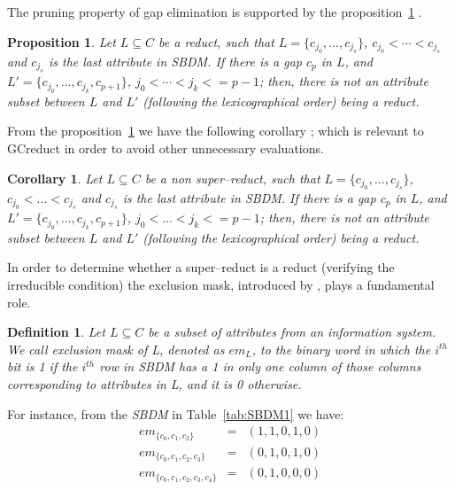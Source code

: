 \documentclass[authoryear,preprint,review,12pt]{elsarticle}
\newtheorem{proposition}{Proposition}
\newtheorem{definition}{Definition}
\newtheorem{corollary}{Corollary}
\begin{document}
	The pruning property of gap elimination is supported by the proposition~\ref{prop:gap} \citep{Santiesteban03}. 
%	
		
	\begin{proposition}\label{prop:gap} 
		Let $L \subseteq C$ be a reduct, such that $L = \lbrace c_{j_0},...,c_{j_s}\rbrace$, $c_{j_0}<\cdots
		<c_{j_s}$ and $c_{j_s}$ is the last attribute in SBDM. If there is a gap $c_p$ in $L$, and $L' = \lbrace
		c_{j_0},...,c_{j_k},c_{p+1}\rbrace$, $j_0<\cdots <j_k<=p-1$; then, there is not an attribute subset
		between $L$ and $L'$ (following the lexicographical order) being a reduct.
	\end{proposition}	
	
	From the proposition~\ref{prop:gap} we have the following corollary \citep{Santiesteban03}; which is relevant to GCreduct in order to avoid other unnecessary evaluations.
	
	\begin{corollary}\label{coro:gap} 
		Let $L \subseteq C$ be a non super--reduct, such that $L = \lbrace c_{j_0},...,c_{j_s}\rbrace$, 
		$c_{j_0}<...<c_{j_s}$ and $c_{j_s}$ is the last attribute in SBDM. If there is a gap $c_p$ in $L$, and 
		$L' = \lbrace c_{j_0},...,c_{j_k},c_{p+1}\rbrace$, $j_0<...<j_k<=p-1$; then, there is not an attribute 
		subset between $L$ and $L'$ (following the lexicographical order) being a reduct.
	\end{corollary}
		
	In order to determine whether a super--reduct is a reduct (verifying the irreducible condition) the
	exclusion mask, introduced by \cite{Lias09}, plays a fundamental role. 
	
	\begin{definition}\label{def:exclusion}
		Let $L \subseteq C$ be a subset of attributes from an information system. We call exclusion mask of L, denoted as $em_L$, to the binary word in which the $i^{\mathit{th}}$ bit is 1 if the $i^{\mathit{th}}$ row in \textit{SBDM} has a 1 in only one column of those columns corresponding to attributes in L, and it is 0 otherwise.
	\end{definition}
	
	For instance, from the \textit{SBDM} in Table~\ref{tab:SBDM1} we have:
	$$\begin{array}{lcc}
	  em_{\lbrace c_0,c_1,c_2\rbrace}         &=& (1,1,0,1,0)\\
	  em_{\lbrace c_0,c_1,c_2,c_3\rbrace}     &=& (0,1,0,1,0)\\
	  em_{\lbrace c_0,c_1,c_2,c_3,c_4\rbrace} &=& (0,1,0,0,0)
	\end{array}$$
	
\end{document}
